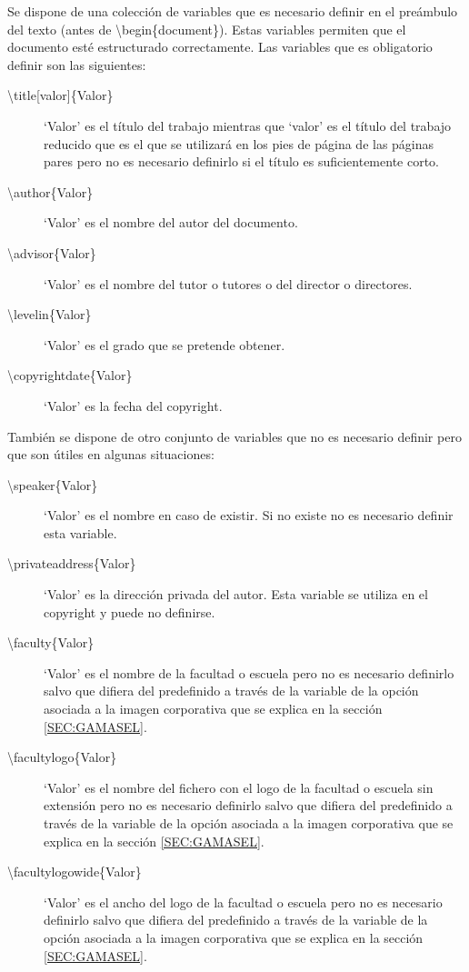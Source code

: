 Se dispone de una colección de variables que es necesario definir en el preámbulo del texto (antes de \textbackslash begin\{document\}). Estas variables permiten que el documento esté estructurado correctamente. Las variables que es obligatorio definir son las siguientes:
\begin{description}
  \item [\textbackslash {title[valor]}\{Valor\}] `Valor' es el título del trabajo mientras que `valor' es el título del trabajo reducido que es el que se utilizará en los pies de página de las páginas pares pero no es necesario definirlo si el título es suficientemente corto.
  \item [\textbackslash author\{Valor\}] `Valor' es el nombre del autor del documento.
  \item [\textbackslash advisor\{Valor\}] `Valor' es el nombre del tutor o tutores o del director o directores.
  \item [\textbackslash levelin\{Valor\}] `Valor' es el grado que se pretende obtener.
  \item [\textbackslash copyrightdate\{Valor\}] `Valor' es la fecha del copyright.
\end{description}

También se dispone de otro conjunto de variables que no es necesario definir pero que son útiles en algunas situaciones:
\begin{description}
  \item [\textbackslash speaker\{Valor\}] `Valor' es el nombre en caso de existir. Si no existe no es necesario definir esta variable.
  \item [\textbackslash privateaddress\{Valor\}] `Valor' es la dirección privada del autor. Esta variable se utiliza en el copyright y puede no definirse.
  \item [\textbackslash faculty\{Valor\}] `Valor' es el nombre de la facultad o escuela pero no es necesario definirlo salvo que difiera del predefinido a través de la variable de la opción asociada a la imagen corporativa que se explica en la sección \ref{SEC:GAMASEL}.
  \item [\textbackslash facultylogo\{Valor\}] `Valor' es el nombre del fichero con el logo de la facultad o escuela sin extensión pero no es necesario definirlo salvo que difiera del predefinido a través de la variable de la opción asociada a la imagen corporativa que se explica en la sección \ref{SEC:GAMASEL}.
  \item [\textbackslash facultylogowide\{Valor\}] `Valor' es el ancho del logo de la facultad o escuela pero no es necesario definirlo salvo que difiera del predefinido a través de la variable de la opción asociada a la imagen corporativa que se explica en la sección \ref{SEC:GAMASEL}.
\end{description}
